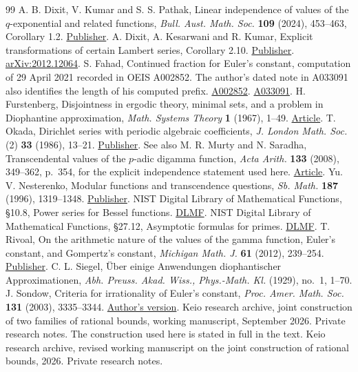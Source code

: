 \documentclass[11pt,a4paper]{article}
\theoremstyle{definition}\newtheorem{definition}[theorem]{Definition}\newtheorem{example}[theorem]{Example}
\theoremstyle{remark}\newtheorem{remark}[theorem]{Remark}
\begin{document}
\begin{thebibliography}{99}
 A. B. Dixit, V. Kumar and S. S. Pathak, Linear independence of values of the $q$-exponential and related functions, \emph{Bull. Aust. Math. Soc.} \textbf{109} (2024), 453--463, Corollary 1.2. \href{https://doi.org/10.1017/S0004972723001028}{Publisher}.
 A. Dixit, A. Kesarwani and R. Kumar, Explicit transformations of certain Lambert series, Corollary 2.10. \href{https://doi.org/10.1007/s40687-022-00331-5}{Publisher}. \href{https://arxiv.org/abs/2012.12064}{arXiv:2012.12064}.
 S. Fahad, Continued fraction for Euler's constant, computation of 29 April 2021 recorded in OEIS A002852. The author's dated note in A033091 also identifies the length of his computed prefix. \href{https://oeis.org/A002852}{A002852}. \href{https://oeis.org/A033091}{A033091}.
 H. Furstenberg, Disjointness in ergodic theory, minimal sets, and a problem in Diophantine approximation, \emph{Math. Systems Theory} \textbf{1} (1967), 1--49. \href{https://doi.org/10.1007/BF01692494}{Article}.
 T. Okada, Dirichlet series with periodic algebraic coefficients, \emph{J. London Math. Soc.} (2) \textbf{33} (1986), 13--21. \href{https://doi.org/10.1112/jlms/s2-33.1.13}{Publisher}. See also M. R. Murty and N. Saradha, Transcendental values of the $p$-adic digamma function, \emph{Acta Arith.} \textbf{133} (2008), 349--362, p.~354, for the explicit independence statement used here. \href{https://www.impan.pl/shop/publication/transaction/download/product/82486}{Article}.
 Yu. V. Nesterenko, Modular functions and transcendence questions, \emph{Sb. Math.} \textbf{187} (1996), 1319--1348. \href{https://doi.org/10.1070/SM1996v187n09ABEH000158}{Publisher}.
 NIST Digital Library of Mathematical Functions, \S10.8, Power series for Bessel functions. \href{https://dlmf.nist.gov/10.8}{DLMF}.
 NIST Digital Library of Mathematical Functions, \S27.12, Asymptotic formulas for primes. \href{https://dlmf.nist.gov/27.12}{DLMF}.
 T. Rivoal, On the arithmetic nature of the values of the gamma function, Euler's constant, and Gompertz's constant, \emph{Michigan Math. J.} \textbf{61} (2012), 239--254. \href{https://doi.org/10.1307/mmj/1339011525}{Publisher}.
 C. L. Siegel, \"Uber einige Anwendungen diophantischer Approximationen, \emph{Abh. Preuss. Akad. Wiss., Phys.-Math. Kl.} (1929), no.~1, 1--70.
 J. Sondow, Criteria for irrationality of Euler's constant, \emph{Proc. Amer. Math. Soc.} \textbf{131} (2003), 3335--3344. \href{https://arxiv.org/abs/math/0209070}{Author's version}.
 Keio research archive, joint construction of two families of rational bounds, working manuscript, September 2026. Private research notes. The construction used here is stated in full in the text.
 Keio research archive, revised working manuscript on the joint construction of rational bounds, 2026. Private research notes.
\end{thebibliography}
\end{document}

